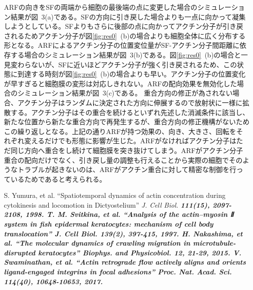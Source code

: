 \documentclass[10pt,twocolumn,a4j]{jarticle}
\begin{document}
ARFの向きをSFの両端から細胞の最後端の点に変更した場合のシミュレーション結果が図~3(a)である。SFの方向に引き戻した場合よりも一点に向かって凝集しようとしている。SFよりもさらに後部の点に向かってアクチン分子が引き戻されるためアクチン分子が図\ref{fig:res0}~(b)の場合よりも細胞全体に広く分布する形となる。ARFによるアクチン分子の位置変位量がSF-アクチン分子間距離に依存する場合のシミュレーション結果が図~3(b)である。図\ref{fig:res0}~(b)の場合と一見変わらないが、SFに近いほどアクチン分子が強く引き戻されるため、この状態に到達する時刻が図\ref{fig:res0}~(b)の場合よりも早い。アクチン分子の位置変化が早すぎると細胞膜の変形は対応しきれない。ARFの配向効果を無効化した場合のシミュレーション結果が図~3(c)である。
重合方向の修正が為されない場合、アクチン分子はランダムに決定された方向に伸展するので放射状に一様に拡散する。アクチン分子はその重合を続けるといずれ先述した消滅条件に該当し、新たな位置から新たな重合方向で再発生するが、重合方向の修正機構がないためこの繰り返しとなる。上記の通りARFが持つ効果の、向き、大きさ、回転をそれぞれ変えるだけでも形態に影響が生じた。ARFがなければアクチン分子はただ同じ方向へ重合をし続けて細胞膜を突き抜けてしまう。ARFがアクチン分子重合の配向だけでなく、引き戻し量の調整も行えることから実際の細胞でそのようなトラブルが起きないのは、ARFがアクチン重合に対して精密な制御を行っているためであると考えられる。

\begin{thebibliography}{9}
  S. Yumura, et al.
    ``Spatiotemporal dynamics of actin concentration during cytokinesis and locomotion in Dictyostelium''  \sl{J. Cell Biol.} \bf{111}\rm{(15)}, 2097-2108, 1998.
      T. M. Svitkina, et al.
    ``Analysis of the actin--myosin Ⅱ system in fish epidermal keratocytes: mechanism of cell body translocation''  \sl{J. Cell Biol.} \bf{139}\rm{(2)}, 397-415, 1997.
   H. Nakashima, et al.
    ``The molecular dynamics of crawling migration in microtubule-disrupted keratocytes''  \sl{Biophys. and Physicobiol.} \bf{12}\rm{}, 21-29, 2015.
        V. Swaminathan, et al.
    ``Actin retrograde flow actively aligns and orients ligand-engaged integrins in focal adhesions''  \sl{Proc. Nat. Acad. Sci.} \bf{114}\rm{(40)}, 10648-10653, 2017.
\end{thebibliography}
\end{document}

